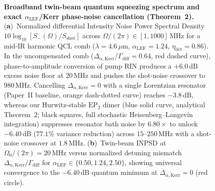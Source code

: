 \documentclass[11pt,letterpaper]{article}
\theoremstyle{definition}
\theoremstyle{remark}
\begin{document}
\begin{figure}[t!]
\centering
\resizebox{0.98\textwidth}{!}{}
\caption{\textbf{Broadband twin-beam quantum squeezing spectrum and exact $\alpha_{\mathrm{LEF}}$/Kerr phase-noise cancellation (Theorem~2).} (\textbf{a})~Normalized differential Intensity Noise Power Spectral Density $10\log_{10}[S_-(\Omega)/S_{\mathrm{shot}}]$ across $\Omega/(2\pi) \in [1, 1000]\,\mathrm{MHz}$ for a mid-IR harmonic QCL comb ($\lambda = 4.6\,\mu\mathrm{m}$, $\alpha_{\mathrm{LEF}} = 1.24$, $\eta_{\mathrm{det}} = 0.86$). In the uncompensated comb ($\Delta_{\alpha,\mathrm{Kerr}}/\Gamma_{\mathrm{diff}} = 0.64$, red dashed curve), phase-to-amplitude conversion of pump RIN produces a $+6.0\,\mathrm{dB}$ excess noise floor at $20\,\mathrm{MHz}$ and pushes the shot-noise crossover to $980\,\mathrm{MHz}$. Cancelling $\Delta_{\alpha,\mathrm{Kerr}} = 0$ with a single Lorentzian resonator (Paper~II baseline, orange dash-dotted curve) reaches $-3.8\,\mathrm{dB}$, whereas our Hurwitz-stable $\mathrm{EP}_2$ dimer (blue solid curve, analytical Theorem~2; black squares, full stochastic Heisenberg--Langevin integration) suppresses resonator bath noise by $6.80\times$ to unlock $-6.40\,\mathrm{dB}$ ($77.1\%$ variance reduction) across $15\text{--}250\,\mathrm{MHz}$ with a shot-noise crossover at $1.8\,\mathrm{MHz}$. (\textbf{b})~Twin-beam INPSD at $\Omega_0/(2\pi) = 20\,\mathrm{MHz}$ versus normalized detuning mismatch $\Delta_{\alpha,\mathrm{Kerr}}/\Gamma_{\mathrm{diff}}$ for $\alpha_{\mathrm{LEF}} \in \{0.50, 1.24, 2.50\}$, showing universal convergence to the $-6.40\,\mathrm{dB}$ quantum minimum at $\Delta_{\alpha,\mathrm{Kerr}} = 0$ (red circle).}
\label{fig:thm2_squeezing}
\end{figure}
\end{document}
